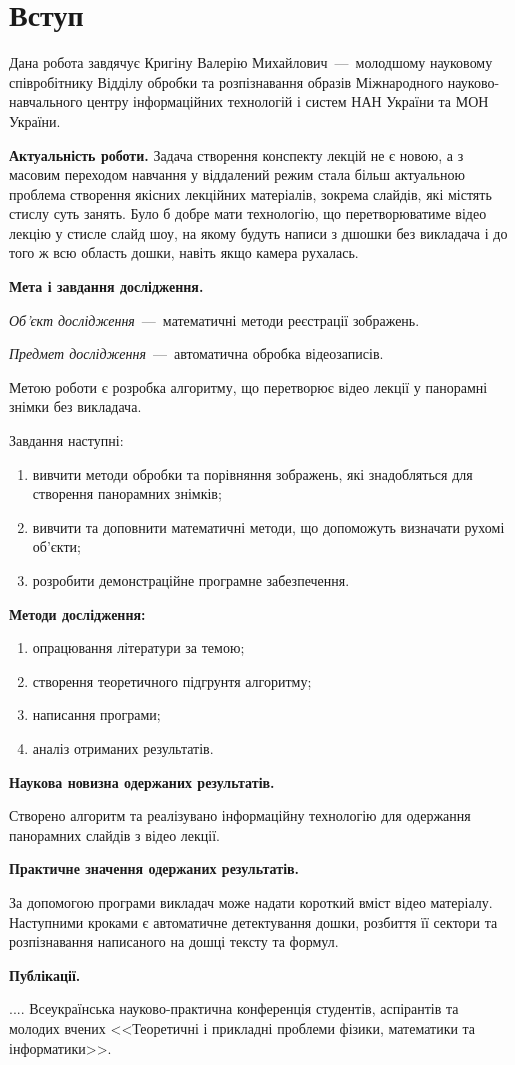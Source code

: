 \chapter*{Вступ}

Дана робота завдячує Кригіну Валерію Михайлович~---~молодшому
науковому співробітнику Відділу обробки та розпізнавання
образів Міжнародного науково-навчального центру інформаційних
технологій і систем НАН України та МОН України.

\textbf{Актуальність роботи.}
Задача створення конспекту лекцій не є новою,
а з масовим переходом навчання у віддалений режим
стала більш актуальною проблема створення якісних
лекційних матеріалів, зокрема слайдів, які містять
стислу суть занять. Було б добре мати технологію, що 
перетворюватиме відео лекцію у стисле слайд шоу, на 
якому будуть написи з дшошки без викладача і до того 
ж всю область дошки, навіть якщо камера
рухалась.

\textbf{Мета і завдання дослідження.}

\textit{Об'єкт дослідження}~---~математичні методи 
реєстрації зображень.

\textit{Предмет дослідження}~---~автоматична обробка 
відеозаписів.

Метою роботи є розробка алгоритму, що перетворює відео 
лекції у панорамні знімки без викладача.

Завдання наступні:
\begin{enumerate}
  \item
    вивчити методи обробки та порівняння зображень, 
    які знадобляться для створення панорамних знімків;
    \item
    вивчити та доповнити математичні методи, 
    що допоможуть визначати рухомі об'єкти;
  \item
  розробити демонстраційне програмне забезпечення.
\end{enumerate}

\textbf{Методи дослідження:}
\begin{enumerate}
    \item опрацювання літератури за темою;
    \item створення теоретичного підгрунтя алгоритму;
    \item написання програми;
    \item аналіз отриманих результатів.
\end{enumerate}

\textbf{Наукова новизна одержаних результатів.}

Створено алгоритм та реалізувано інформаційну технологію 
для одержання панорамних слайдів з відео лекції.

\textbf{Практичне значення одержаних результатів.}

За допомогою програми викладач може надати короткий вміст 
відео матеріалу. Наступними кроками є автоматичне детектування 
дошки, розбиття її сектори та розпізнавання написаного на 
дошці тексту та формул.

\textbf{Публікації.}

.... Всеукраїнська науково-практична конференція студентів,
аспірантів та молодих вчених <<Теоретичні і прикладні проблеми фізики,
математики та інформатики>>.